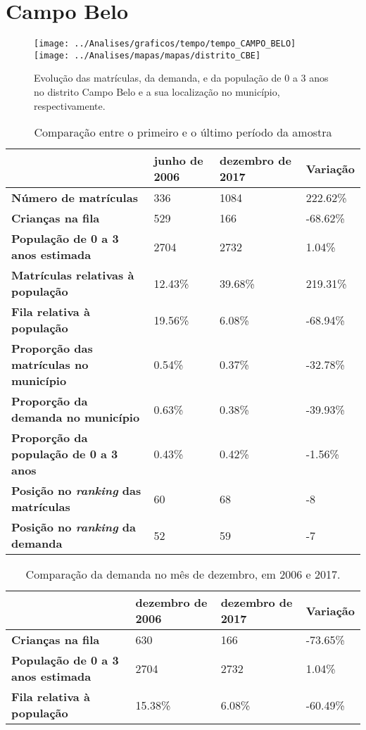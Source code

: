 \section{Campo Belo}
\begin{figure}[H]
\centering
\texttt{[image: ../Analises/graficos/tempo/tempo\_CAMPO\_BELO]}
\texttt{[image: ../Analises/mapas/mapas/distrito\_CBE]}
\caption{Evolução das matrículas, da demanda, e da população de 0 a 3 anos no distrito Campo Belo e a sua localização no município, respectivamente.}
\end{figure}
\begin{table}[H]
\begin{tabular}{l|l|l|l}
\textbf{}                                      & \textbf{junho de 2006}       & \textbf{dezembro de 2017}    & \textbf{Variação} \\ \hline
\textbf{Número de matrículas}                  & 336 & 1084 & 222.62\% \\ \hline
\textbf{Crianças na fila}                      & 529 & 166 & -68.62\% \\ \hline
\textbf{População de 0 a 3 anos estimada}      & 2704 & 2732 & 1.04\% \\ \hline
\textbf{Matrículas relativas à população}      & 12.43\% & 39.68\% & 219.31\% \\ \hline
\textbf{Fila relativa à população}             & 19.56\% & 6.08\% & -68.94\% \\ \hline
\textbf{Proporção das matrículas no município} & 0.54\% & 0.37\% & -32.78\% \\ \hline
\textbf{Proporção da demanda no município}     & 0.63\% & 0.38\% & -39.93\% \\ \hline
\textbf{Proporção da população de 0 a 3 anos}  & 0.43\% & 0.42\% & -1.56\% \\ \hline
\textbf{Posição no \textit{ranking} das matrículas}     & 60 & 68 & -8 \\ \hline
\textbf{Posição no \textit{ranking} da demanda}         & 52 & 59 & -7 \\ 
\end{tabular}
\caption{Comparação entre o primeiro e o último período da amostra}
\end{table}
\begin{table}[H]
\begin{tabular}{l|l|l|l}
\textbf{}                                 & \textbf{dezembro de 2006} & \textbf{dezembro de 2017} & \textbf{Variação} \\ \hline
\textbf{Crianças na fila}                      & 630 & 166 & -73.65\% \\ \hline
\textbf{População de 0 a 3 anos estimada}      & 2704 & 2732 & 1.04\% \\ \hline
\textbf{Fila relativa à população}             & 15.38\% & 6.08\% & -60.49\% \\
\end{tabular}
\caption{Comparação da demanda no mês de dezembro, em 2006 e 2017.}
\end{table}
